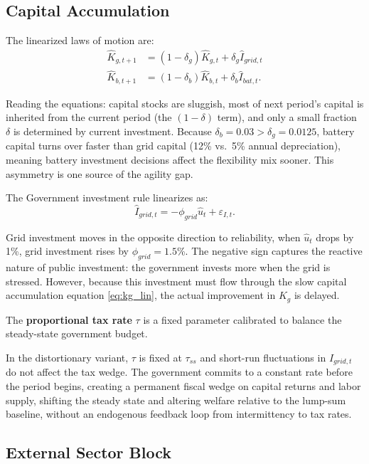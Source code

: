 	
\subsection{Capital Accumulation}
	
	The linearized laws of motion are:
	\begin{align}
		\hat{K}_{g,t+1} &= (1-\delta_g)\hat{K}_{g,t} + \delta_g \hat{I}_{grid,t} \label{eq:kg_lin} \\
		\hat{K}_{b,t+1} &= (1-\delta_b)\hat{K}_{b,t} + \delta_b \hat{I}_{bat,t} \label{eq:kb_lin}.
	\end{align}
	
	\noindent Reading the equations: capital stocks are sluggish, most of next period's capital is inherited from the current period (the $(1-\delta)$ term), and only a small fraction $\delta$ is determined by current investment. Because $\delta_b = 0.03 > \delta_g = 0.0125$, battery capital turns over faster than grid capital (12\% vs.\ 5\% annual depreciation), meaning battery investment decisions affect the flexibility mix sooner. This asymmetry is one source of the agility gap.
	
	The Government investment rule linearizes as:
	\begin{equation}
		\hat{I}_{grid,t} = -\phi_{grid} \hat{u}_t + \varepsilon_{I,t}
		\label{eq:gridrule_lin}.
	\end{equation}
	
	Grid investment moves in the opposite direction to reliability, when $\hat{u}_t$ drops by 1\%, grid investment rises by $\phi_{grid} = 1.5$\%. The negative sign captures the reactive nature of public investment: the government invests more when the grid is stressed. However, because this investment must flow through the slow capital accumulation equation \eqref{eq:kg_lin}, the actual improvement in $K_g$ is delayed.
	
	The \textbf{proportional tax rate} $\tau$ is a fixed parameter calibrated to balance the steady-state government budget.
	
	In the distortionary variant, $\tau$ is fixed at $\tau_{ss}$ and short-run fluctuations in $I_{grid,t}$ do not affect the tax wedge. The government commits to a constant rate before the period begins, creating a permanent fiscal wedge on capital returns and labor supply, shifting the steady state and altering welfare relative to the lump-sum baseline, without an endogenous feedback loop from intermittency to tax rates.
	
	
\subsection{External Sector Block}
	

